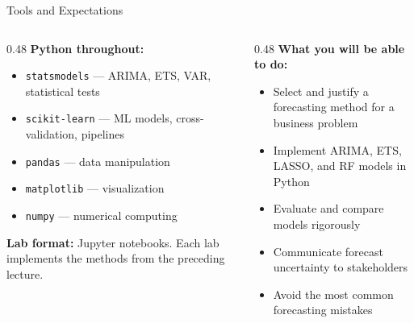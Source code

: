 \documentclass[aspectratio=169, 11pt]{beamer}
\begin{document}
\begin{frame}{Tools and Expectations}
  \begin{columns}[T]
    \begin{column}{0.48\textwidth}
      \textbf{Python throughout:}
      \begin{itemize}
        \item \texttt{statsmodels} --- ARIMA, ETS, VAR, statistical tests
        \item \texttt{scikit-learn} --- ML models, cross-validation, pipelines
        \item \texttt{pandas} --- data manipulation
        \item \texttt{matplotlib} --- visualization
        \item \texttt{numpy} --- numerical computing
      \end{itemize}
      \vspace{0.2cm}
      \textbf{Lab format:} Jupyter notebooks.
      Each lab implements the methods from the preceding lecture.
    \end{column}
    \begin{column}{0.48\textwidth}
      \textbf{What you will be able to do:}
      \begin{itemize}
        \item[\pos{$\checkmark$}] Select and justify a forecasting method for a business problem
        \item[\pos{$\checkmark$}] Implement ARIMA, ETS, LASSO, and RF models in Python
        \item[\pos{$\checkmark$}] Evaluate and compare models rigorously
        \item[\pos{$\checkmark$}] Communicate forecast uncertainty to stakeholders
        \item[\pos{$\checkmark$}] Avoid the most common forecasting mistakes
      \end{itemize}
    \end{column}
  \end{columns}
\end{frame}
\end{document}
